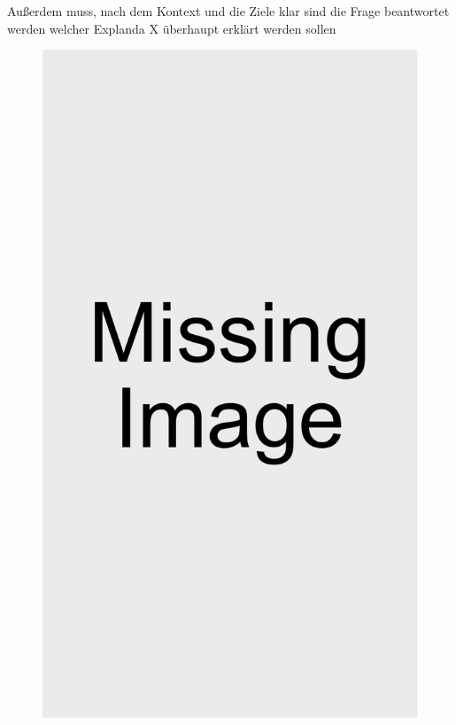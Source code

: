 Außerdem muss, nach dem Kontext und die Ziele klar sind die Frage beantwortet werden welcher Explanda X überhaupt erklärt werden sollen \cite{kohl_explainability_2019}

\newpage

\begin{figure}
    \includegraphics{contents/res/missing_image.pdf}
    \label{fig:model_overview_all}
\end{figure}